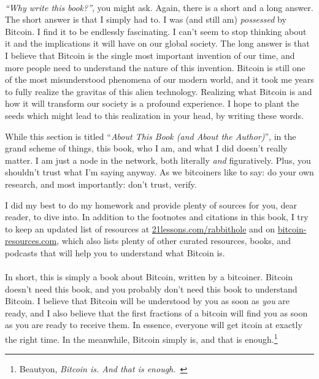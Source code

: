 \paragraph{}
\textit{\enquote{Why write this book?}}, you might
ask. Again, there is a short and a long answer. The short answer is that I
simply had to. I was (and still am) \textit{possessed} by Bitcoin. I find it to
be endlessly fascinating. I can't seem to stop thinking about it and the
implications it will have on our global society. The long answer is that I
believe that Bitcoin is the single most important invention of our time, and
more people need to understand the nature of this invention. Bitcoin is
still one of the most misunderstood phenomena of our modern world, and it took
me years to fully realize the gravitas of this alien technology. Realizing what
Bitcoin is and how it will transform our society is a profound experience. I
hope to plant the seeds which might lead to this realization in your head, by
writing these words.

While this section is titled \enquote{\textit{About This Book (and About the
Author)}}, in the grand scheme of things, this book, who I am, and what I did
doesn't really matter. I am just a node in the network, both literally
\textit{and} figuratively. Plus, you shouldn't trust what I'm saying anyway. As
we bitcoiners like to say: do your own research, and most importantly: don't
trust, verify.

I did my best to do my homework and provide plenty of sources for you, dear
reader, to dive into. In addition to the footnotes and citations in this book, I
try to keep an updated list of resources at
\href{https://21lessons.com/rabbithole}{21lessons.com/rabbithole} and on
\href{https://bitcoin-resources.com}{bitcoin-resources.com}, which also lists
plenty of other curated resources, books, and podcasts that will help you to
understand what Bitcoin is.

\paragraph{}
In short, this is simply a book about Bitcoin, written by a bitcoiner.
Bitcoin doesn't need this book, and you probably don't need this book to
understand Bitcoin. I believe that Bitcoin will be understood by you as soon as
\textit{you} are ready, and I also believe that the first fractions of a bitcoin
will find you as soon as you are ready to receive them. In essence, everyone
will get \bitcoinB{}itcoin at exactly the right time. In the meanwhile, Bitcoin
simply is, and that is enough.\footnote{Beautyon, \textit{Bitcoin is. And that
is enough.}~\cite{bitcoin-is}}
